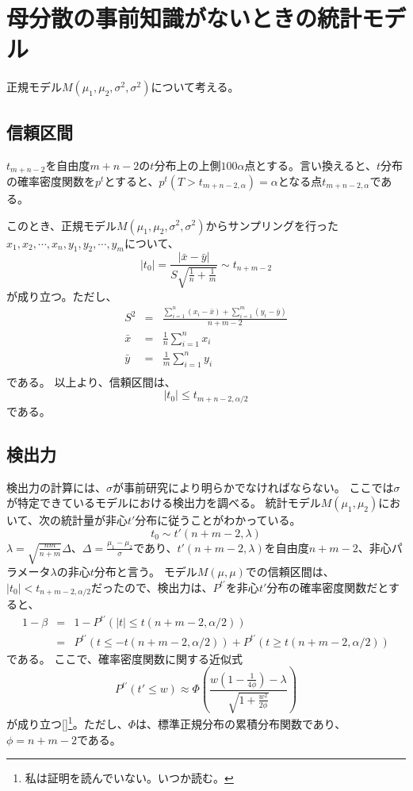 \section{母分散の事前知識がないときの統計モデル}
正規モデル$M(\mu_1,\mu_2,\sigma^2,\sigma^2)$について考える。

\subsection{信頼区間}
$t_{m+n-2}$を自由度$m+n-2$の$t$分布上の上側$100\alpha$点とする。言い換えると、$t$分布の確率密度関数を$p^t$とすると、$p^t(T > t_{m+n-2,\alpha}) = \alpha$となる点$t_{m+n-2,\alpha}$である。

このとき、正規モデル$M(\mu_1,\mu_2,\sigma^2,\sigma^2)$からサンプリングを行った$x_1,x_2,\cdots,x_n,y_1,y_2,\cdots,y_m$について、
\begin{equation*}
    |t_0| = \frac{|\bar{x}-\bar{y}|}{S\sqrt{\frac{1}{n}+\frac{1}{m}}}\sim t_{n+m-2}
\end{equation*}
が成り立つ。ただし、
\begin{eqnarray*}
    S^2 &=& \frac{\sum_{i=1}^n(x_i-\bar{x})+\sum_{i=1}^m (y_i-\bar{y})}{n+m-2} \\
    \bar{x} &=& \frac{1}{n}\sum_{i=1}^n x_i\\
    \bar{y} &=& \frac{1}{m}\sum_{i=1}^n y_i\\
\end{eqnarray*}
である。
以上より、信頼区間は、
\begin{equation*}
    |t_0| \leq t_{m+n-2,\alpha/2}
\end{equation*}
である。

\subsection{検出力}
検出力の計算には、$\sigma$が事前研究により明らかでなければならない。
ここでは$\sigma$が特定できているモデルにおける検出力を調べる。
統計モデル$M(\mu_1,\mu_2)$において、次の統計量が非心$t'$分布に従うことがわかっている。
\begin{equation*}
     t_0\sim t'(n+m-2,\lambda)
\end{equation*}
$\lambda = \sqrt{\frac{nm}{n+m}}\Delta$、$\Delta =\frac{\mu_1-\mu_2}{\sigma}$であり、$t'(n+m-2,\lambda)$を自由度$n+m-2$、非心パラメータ$\lambda$の非心$t$分布と言う。
モデル$M(\mu,\mu)$での信頼区間は、$|t_0|<t_{n+m-2,\alpha/2}$だったので、検出力は、$P^{t'}$を非心$t'$分布の確率密度関数だとすると、
\begin{eqnarray*}
    1-\beta &=& 1-P^{t'}( |t| \leq t(n+m-2,\alpha/2)) \\
    &=& P^{t'}( t \leq -t(n+m-2,\alpha/2))+P^{t'}(t \geq t(n+m-2,\alpha/2))
\end{eqnarray*}
である。
ここで、確率密度関数に関する近似式
\begin{equation*}
    P^{t'}(t'\leq w) \approx \varPhi \left( \frac{w(1-\frac{1}{4\phi})-\lambda}{\sqrt{1+\frac{w^2}{2\phi}}} \right)
\end{equation*}
が成り立つ[\cite{2003サンプルサイズの決め方}]\footnote{私は証明を読んでいない。いつか読む。}。ただし、$\varPhi$は、標準正規分布の累積分布関数であり、$\phi=n+m-2$である。


